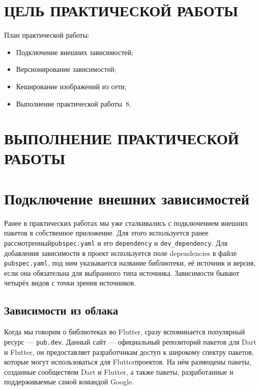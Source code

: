 \section*{ЦЕЛЬ ПРАКТИЧЕСКОЙ РАБОТЫ}

План практической работы:

\begin{itemize}
	\item Подключение внешних зависимостей;
	\item Версионирование зависимостей;
	\item Кеширование изображений из сети;
	\item Выполнение практической работы \No\,8.
\end{itemize}

\clearpage

\section*{ВЫПОЛНЕНИЕ ПРАКТИЧЕСКОЙ РАБОТЫ}

\section{Подключение внешних зависимостей}

Ранее в практических работах мы уже сталкивались
с подключением внешних пакетов в собственное приложение.
Для этого используется ранее рассмотренный\texttt{pubspec.yaml} 
и его \texttt{dependency} и \texttt{dev\_dependency}.
Для добавления зависимости в проект используется поле dependencies
в файле \texttt{pubspec.yaml}, под ним указывается название библиотеки,
её источник и версия, если она обязательна для выбранного типа источника.
Зависимости бывают четырёх видов с точки зрения источников.

\subsection{Зависимости из облака}

Когда мы говорим о библиотеках во Flutter,
сразу вспоминается популярный ресурс --- \texttt{pub.dev}.
Данный сайт --- официальный репозиторий пакетов для Dart и Flutter,
он предоставляет разработчикам доступ к широкому спектру пакетов,
которые могут использоваться для Flutterпроектов.
На нём размещены пакеты, созданные сообществом Dart и Flutter,
а также пакеты, разработанные и поддерживаемые самой командой Google.

